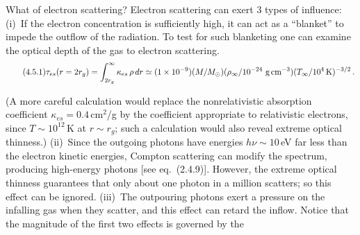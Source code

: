 What of electron scattering?  Electron scattering can exert 3 types of influence:
(i)~If the electron concentration is sufficiently high, it can act as a ``blanket'' to
impede the outflow of the radiation.  To test for such blanketing one can examine
the optical depth of the gas to electron scattering.
%
\begin{equation}
\tag{4.5.1}
\tau_{es}(r = 2r_g)
= \int_{2r_g}^{\infty}\kappa_{es}\,\rho\, dr
\simeq (1 \times 10^{-9})(M/M_\odot)
  (\rho_\infty / 10^{-24}~\text{g\,cm}^{-3})
  (T_\infty / 10^4\,\text{K})^{-3/2}\,.
\end{equation}

(A more careful calculation would replace the nonrelativistic absorption
coefficient $\kappa_{es} = 0.4$\,cm$^2$/g by the coefficient appropriate to relativistic
electrons, since $T \sim 10^{12}$\,K at $r \sim r_g$; such a calculation would also reveal
extreme optical thinness.)  (ii)~Since the outgoing photons have energies
$h\nu \sim 10$\,eV far less than the electron kinetic energies, Compton scattering can
modify the spectrum, producing high-energy photons [see eq.~(2.4.9)].  However,
the extreme optical thinness guarantees that only about one photon in a million
scatters; so this effect can be ignored.  (iii)~The outpouring photons exert a
pressure on the infalling gas when they scatter, and this effect can retard the
inflow.  Notice that the magnitude of the first two effects is governed by the

